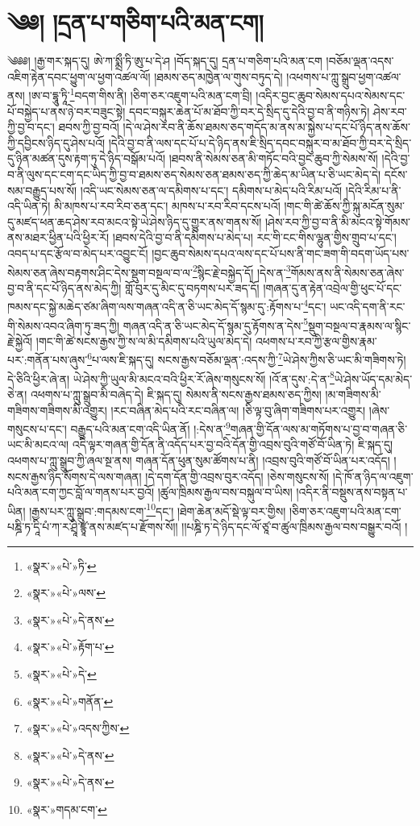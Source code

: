 \chapter{༄༅། །དྲན་པ་གཅིག་པའི་མན་ངག།}༄༅༅། །རྒྱ་གར་སྐད་དུ། ཨེ་ཀ་སྨྲྀ་ཏི་ཨུ་པ་དེ་ཤ །བོད་སྐད་དུ། དྲན་པ་གཅིག་པའི་མན་ངག །བཅོམ་ལྡན་འདས་འཇིག་རྟེན་དབང་ཕྱུག་ལ་ཕྱག་འཚལ་ལོ། །ཐམས་ཅད་མཁྱེན་ལ་གུས་བཏུད་དེ། །འཕགས་པ་ཀླུ་སྒྲུབ་ཕྱག་འཚལ་ནས། །ཨ་བ་དྷཱུ་ཏཱི་\footnote{«སྣར་»«པེ་»ཏི་}བདག་གིས་ནི། །ཅིག་ཅར་འཇུག་པའི་མན་ངག་བྲི། །འདིར་བྱང་ཆུབ་སེམས་དཔའ་སེམས་དང་པོ་བསྐྱེད་པ་ནས་ཉེ་བར་བཟུང་སྟེ། དབང་བསྐུར་ཆེན་པོ་མ་ཐོབ་ཀྱི་བར་དེ་སྲིད་དུ་དེའི་བྱ་བ་ནི་གཉིས་ཏེ། ཤེས་རབ་ཀྱི་བྱ་བ་དང་། ཐབས་ཀྱི་བྱ་བའོ། །དེ་ལ་ཤེས་རབ་ནི་ཆོས་ཐམས་ཅད་གདོད་མ་ནས་མ་སྐྱེས་པ་དང་པོ་ཉིད་ནས་ཆོས་ཀྱི་དབྱིངས་ཉིད་དུ་ཤེས་པའོ། །དེའི་བྱ་བ་ནི་ལས་དང་པོ་པ་དེ་ཉིད་ནས་ཇི་སྲིད་དབང་བསྐུར་བ་མ་ཐོབ་ཀྱི་བར་དེ་སྲིད་དུ་ཉིན་མཚན་དུས་རྟག་ཏུ་དེ་ཉིད་བསྒོམ་པའོ། །ཐབས་ནི་སེམས་ཅན་མི་གཏོང་བའི་བྱང་ཆུབ་ཀྱི་སེམས་སོ། །དེའི་བྱ་བ་ནི་ལུས་དང་ངག་དང་ཡིད་ཀྱི་བྱ་བ་ཐམས་ཅད་སེམས་ཅན་ཐམས་ཅད་ཀྱི་ཆེད་མ་ཡིན་པ་ཅི་ཡང་མེད་དེ། དངོས་སམ་བརྒྱུད་པས་སོ། །འདི་ཡང་སེམས་ཅན་ལ་དམིགས་པ་དང་། དམིགས་པ་མེད་པའི་རིམ་པའོ། །དེའི་རིམ་པ་ནི་འདི་ཡིན་ཏེ། མི་མཁས་པ་རབ་རིབ་ཅན་དང་། མཁས་པ་རབ་རིབ་དངས་པའོ། །གང་གི་ཚེ་ཆོས་ཀྱི་སྐུ་མངོན་སུམ་དུ་མཛད་ཕན་ཆད་ཤེས་རབ་མངའ་སྟེ་ཡེ་ཤེས་ཉིད་དུ་གྱུར་ནས་གནས་སོ། །ཤེས་རབ་ཀྱི་བྱ་བ་ནི་མི་མངའ་སྟེ་གོམས་ནས་མཐར་ཕྱིན་པའི་ཕྱིར་རོ། །ཐབས་དེའི་བྱ་བ་ནི་དམིགས་པ་མེད་པ། རང་གི་ངང་གིས་ལྷུན་གྱིས་གྲུབ་པ་དང་། འབད་པ་དང་རྩོལ་བ་མེད་པར་འབྱུང་ངོ། །བྱང་ཆུབ་སེམས་དཔའ་ལས་དང་པོ་པས་ནི་གང་ཟག་གི་བདག་ཡོད་པས་སེམས་ཅན་ཞེས་བརྟགས་ཤིང་དེས་སྡུག་བསྔལ་བ་ལ་\footnote{«སྣར་»«པེ་»ལས་}སྙིང་རྗེ་བསྐྱེད་དོ། །དེས་ན་\footnote{«སྣར་»«པེ་»དེ་ནས་}གོམས་ནས་ནི་སེམས་ཅན་ཞེས་བྱ་བ་ནི་དང་པོ་ཉིད་ནས་མེད་ཀྱི། གློ་བུར་དུ་མིང་དུ་བཏགས་པར་ཟད་དོ། །གཞན་དུ་ན་རྟེན་འབྲེལ་གྱི་ཕུང་པོ་དང་ཁམས་དང་སྐྱེ་མཆེད་ཙམ་ཞིག་ལས་གཞན་འདི་ན་ཅི་ཡང་མེད་དོ་སྙམ་དུ་:རྟོགས་པ་\footnote{«སྣར་»«པེ་»རྟོག་པ་}དང་། ཡང་འདི་དག་ནི་རང་གི་སེམས་འབའ་ཞིག་ཏུ་ཟད་ཀྱི། གཞན་འདི་ན་ཅི་ཡང་མེད་དོ་སྙམ་དུ་རྟོགས་ན་དེས་\footnote{«སྣར་»«པེ་»དེ་}སྡུག་བསྔལ་བ་རྣམས་ལ་སྙིང་རྗེ་སྐྱེའོ། །གང་གི་ཚེ་སངས་རྒྱས་ཀྱི་ས་ལ་མི་དམིགས་པའི་ཡུལ་མེད་དེ། འཕགས་པ་རབ་ཀྱི་རྩལ་གྱིས་རྣམ་པར་:གནོན་པས་ཞུས་\footnote{«སྣར་»«པེ་»གནོན་}པ་ལས་ཇི་སྐད་དུ། སངས་རྒྱས་བཅོམ་ལྡན་:འདས་ཀྱི་\footnote{«སྣར་»«པེ་»འདས་ཀྱིས་}ཡེ་ཤེས་ཀྱིས་ཅི་ཡང་མི་གཟིགས་ཏེ། དེ་ཅིའི་ཕྱིར་ཞེ་ན། ཡེ་ཤེས་ཀྱི་ཡུལ་མི་མངའ་བའི་ཕྱིར་རོ་ཞེས་གསུངས་སོ། །འོ་ན་དུས་:དེ་ན་\footnote{«སྣར་»«པེ་»དེ་ནས་}ཡེ་ཤེས་ཡོད་དམ་མེད་ཅེ་ན། འཕགས་པ་ཀླུ་སྒྲུབ་མི་བཞེད་དེ། ཇི་སྐད་དུ། སེམས་ནི་སངས་རྒྱས་ཐམས་ཅད་ཀྱིས། །མ་གཟིགས་མི་གཟིགས་གཟིགས་མི་འགྱུར། །རང་བཞིན་མེད་པའི་རང་བཞིན་ལ། །ཅི་ལྟ་བུ་ཞིག་གཟིགས་པར་འགྱུར། །ཞེས་གསུངས་པ་དང་། བརྒྱུད་པའི་མན་ངག་འདི་ཡིན་ནོ། །:དེས་ན་\footnote{«སྣར་»«པེ་»དེ་ནས་}གཞན་གྱི་དོན་ལས་མ་གཏོགས་པ་བྱ་བ་གཞན་ཅི་ཡང་མི་མངའ་ལ། འདི་ལྟར་གཞན་གྱི་དོན་ནི་འདོད་པར་བྱ་བའི་དོན་གྱི་འབྲས་བུའི་གཙོ་བོ་ཡིན་ཏེ། ཇི་སྐད་དུ། འཕགས་པ་ཀླུ་སྒྲུབ་ཀྱི་ཞལ་སྔ་ནས། གཞན་དོན་ཕུན་སུམ་ཚོགས་པ་ནི། །འབྲས་བུའི་གཙོ་བོ་ཡིན་པར་འདོད། །སངས་རྒྱས་ཉིད་སོགས་དེ་ལས་གཞན། །དེ་དག་དོན་གྱི་འབྲས་བུར་འདོད། །ཅེས་གསུངས་སོ། །དེ་ཁོ་ན་ཉིད་ལ་འཇུག་པའི་མན་ངག་ཀྱང་བློ་ལ་གནས་པར་བྱའོ། །ཚུལ་ཁྲིམས་རྒྱལ་བས་བསྐུལ་བ་ཡིས། །འདིར་ནི་བསྡུས་ནས་བསྟན་པ་ཡིན། །རྒྱས་པར་ཀླུ་སྒྲུབ་:གདམས་ངག་\footnote{«སྣར་»གདམ་ངག་}དང་། །ཐེག་ཆེན་མདོ་སྡེ་ལྟ་བར་གྱིས། །ཅིག་ཅར་འཇུག་པའི་མན་ངག་པཎྜི་ཏ་དཱི་པཾ་ཀ་ར་ཤྲཱི་ཛྙཱ་ནས་མཛད་པ་རྫོགས་སོ།། །།པཎྜི་ཏ་དེ་ཉིད་དང་ལོ་ཙཱ་བ་ཚུལ་ཁྲིམས་རྒྱལ་བས་བསྒྱུར་བའོ། ། 